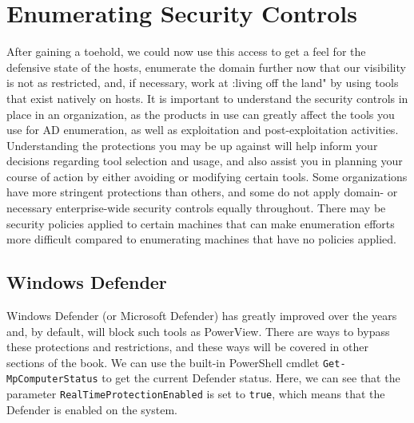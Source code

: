 \section{Enumerating Security Controls}
After gaining a toehold, we could now use this access to get a feel for the defensive state of the hosts, enumerate the domain further now that our visibility is not as restricted, and, if necessary, work at :living off the land" by using tools that exist natively on hosts. It is important to understand the security controls in place in an organization, as the products in use can greatly affect the tools you use for AD enumeration, as well as exploitation and post-exploitation activities. Understanding the protections you may be up against will help inform your decisions regarding tool selection and usage, and also assist you in planning your course of action by either avoiding or modifying certain tools. Some organizations have more stringent protections than others, and some do not apply domain- or necessary enterprise-wide security controls equally throughout. There may be security policies applied to certain machines that can make enumeration efforts more difficult compared to enumerating machines that have no policies applied.


\subsection{Windows Defender}
Windows Defender (or Microsoft Defender) has greatly improved over the years and, by default, will block such tools as PowerView. There are ways to bypass these protections and restrictions, and these ways will be covered in other sections of the book. We can use the built-in PowerShell cmdlet \texttt{Get-MpComputerStatus} to get the current Defender status. Here, we can see that the parameter \verb|RealTimeProtectionEnabled| is set to \texttt{true}, which means that the Defender is enabled on the system.

